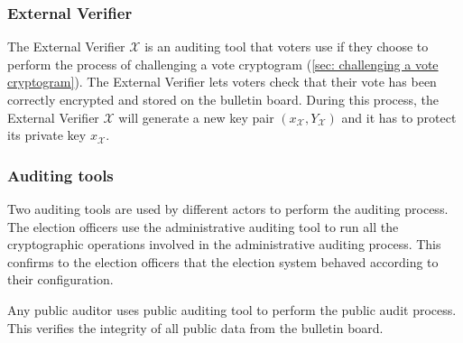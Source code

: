 \subsubsection{External Verifier}
The External Verifier $\mathcal{X}$ is an auditing tool that voters use if they choose to perform the process of challenging a vote cryptogram (\cref{sec: challenging a vote cryptogram}). The External Verifier lets voters check that their vote has been correctly encrypted and stored on the bulletin board. During this process, the External Verifier $\mathcal{X}$ will generate a new key pair $(x_\mathcal{X}, Y_\mathcal{X})$ and it has to protect its private key $x_\mathcal{X}$.


\subsubsection{Auditing tools}
Two auditing tools are used by different actors to perform the auditing process. The election officers use the administrative auditing tool to run all the cryptographic operations involved in the administrative auditing process. This confirms to the election officers that the election system behaved according to their configuration.

Any public auditor uses public auditing tool to perform the public audit process. This verifies the integrity of all public data from the bulletin board.
